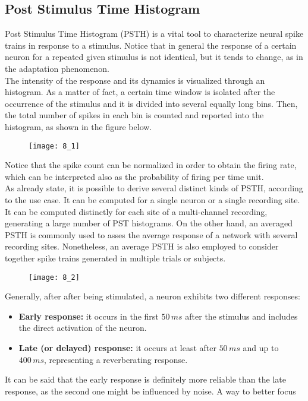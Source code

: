 \subsection{Post Stimulus Time Histogram}
Post Stimulus Time Histogram (PSTH) is a vital tool to characterize neural spike trains
in response to a stimulus. Notice that in general the response of a certain neuron
for a repeated given stimulus is not identical, but it tends to change, as in the
adaptation phenomenon.\\
The intensity of the response and its dynamics is visualized through an histogram.
As a matter of fact, a certain time window is isolated after the occurrence of the
stimulus and it is divided into several equally long bins. Then, the total number of
spikes in each bin is counted and reported into the histogram, as shown in the figure
below.
\begin{figure}[H]
    \texttt{[image: 8\_1]}
    \centering
\end{figure}
Notice that the spike count can be normalized in order to obtain the firing rate, which
can be interpreted also as the probability of firing per time unit.\\
As already state, it is possible to derive several distinct kinds of PSTH, according to
the use case. It can be computed for a single neuron or a single recording site. It
can be computed distinctly for each site of a multi-channel recording, generating
a large number of PST histograms. On the other hand, an averaged PSTH is commonly used
to asses the average response of a network with several recording sites. Nonetheless,
an average PSTH is also employed to consider together spike trains generated in
multiple trials or subjects.
\begin{figure}[H]
    \texttt{[image: 8\_2]}
    \centering
\end{figure}
Generally, after after being stimulated, a neuron exhibits two different responses:
\begin{itemize}
    \item \textbf{Early response:} it occurs in the first \(50\,ms\) after the stimulus
          and includes the direct activation of the neuron.
    \item \textbf{Late (or delayed) response:} it occurs at least after \(50\,ms\) and up to
          \(400\,ms\), representing a reverberating response.
\end{itemize}
It can be said that the early response is definitely more reliable than the late
response, as the second one might be influenced by noise. A way to better focus
